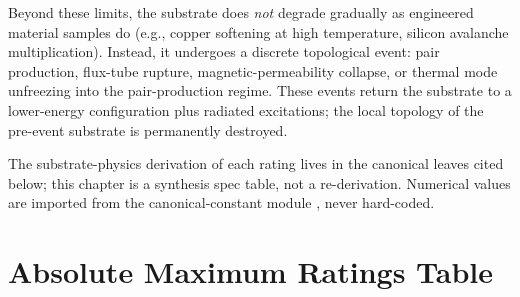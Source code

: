 Beyond these limits, the substrate does \emph{not} degrade gradually as engineered material samples do (e.g., copper softening at high temperature, silicon avalanche multiplication). Instead, it undergoes a discrete topological event: pair production, flux-tube rupture, magnetic-permeability collapse, or thermal mode unfreezing into the pair-production regime. These events return the substrate to a lower-energy configuration plus radiated excitations; the local topology of the pre-event substrate is permanently destroyed.

The substrate-physics derivation of each rating lives in the canonical leaves cited below; this chapter is a synthesis spec table, not a re-derivation. Numerical values are imported from the canonical-constant module , never hard-coded.

\section{Absolute Maximum Ratings Table}
\label{sec:vol9_absmax_table}


